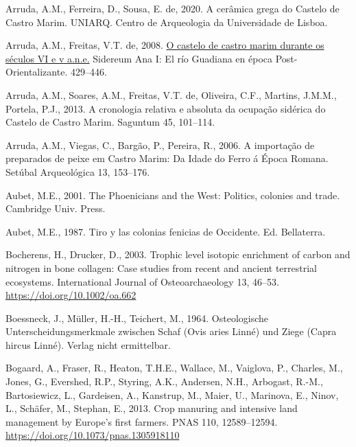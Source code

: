 \documentclass[preprint, 3p, authoryear]{elsarticle} %
\newlength{\cslhangindent}
\newlength{\cslentryspacingunit} %
\newenvironment{CSLReferences}[2] %
 {%
  \setlength{\parindent}{0pt}
  \ifodd #1
  \let\oldpar\par
  \def\par{\hangindent=\cslhangindent\oldpar}
  \fi
  \setlength{\parskip}{#2\cslentryspacingunit}
 }%
 {}
\begin{document}
\begin{CSLReferences}{1}{0}
\leavevmode{}%
Arruda, A.M., Ferreira, D., Sousa, E. de, 2020. A cerâmica grega do {Castelo} de {Castro Marim}. {UNIARQ. Centro de Arqueologia da Universidade de Lisboa}.

\leavevmode{}%
Arruda, A.M., Freitas, V.T. de, 2008. \href{https://repositorio.ul.pt/handle/10451/9778}{O castelo de castro marim durante os séculos VI e v a.n.e.} Sidereum Ana I: El río Guadiana en época Post-Orientalizante. 429--446.

\leavevmode{}%
Arruda, A.M., Soares, A.M., Freitas, V.T. de, Oliveira, C.F., Martins, J.M.M., Portela, P.J., 2013. A cronologia relativa e absoluta da ocupação sidérica do {Castelo} de {Castro Marim}. Saguntum 45, 101--114.

\leavevmode{}%
Arruda, A.M., Viegas, C., Bargão, P., Pereira, R., 2006. A importação de preparados de peixe em {Castro Marim}: Da {Idade} do {Ferro} á {Época Romana}. Setúbal Arqueológica 13, 153--176.

\leavevmode{}%
Aubet, M.E., 2001. The {Phoenicians} and the {West}: Politics, colonies and trade. {Cambridge Univ. Press}.

\leavevmode{}%
Aubet, M.E., 1987. Tiro y las colonias fenicias de {Occidente}. {Ed. Bellaterra}.

\leavevmode{}%
Bocherens, H., Drucker, D., 2003. Trophic level isotopic enrichment of carbon and nitrogen in bone collagen: Case studies from recent and ancient terrestrial ecosystems. International Journal of Osteoarchaeology 13, 46--53. \url{https://doi.org/10.1002/oa.662}

\leavevmode{}%
Boessneck, J., Müller, H.-H., Teichert, M., 1964. Osteologische {Unterscheidungsmerkmale} zwischen {Schaf} ({Ovis} aries {Linné}) und {Ziege} ({Capra} hircus {Linné}). {Verlag nicht ermittelbar}.

\leavevmode{}%
Bogaard, A., Fraser, R., Heaton, T.H.E., Wallace, M., Vaiglova, P., Charles, M., Jones, G., Evershed, R.P., Styring, A.K., Andersen, N.H., Arbogast, R.-M., Bartosiewicz, L., Gardeisen, A., Kanstrup, M., Maier, U., Marinova, E., Ninov, L., Schäfer, M., Stephan, E., 2013. Crop manuring and intensive land management by {Europe}'s first farmers. PNAS 110, 12589--12594. \url{https://doi.org/10.1073/pnas.1305918110}


\end{CSLReferences}
\end{document}
